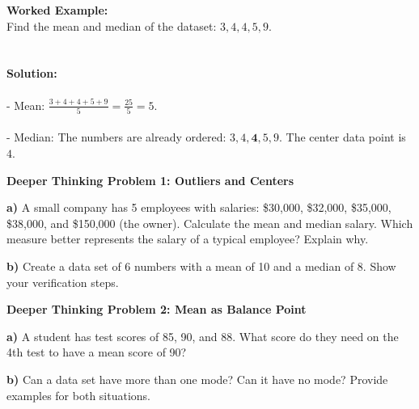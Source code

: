 \documentclass[12pt, letterpaper, fleqn]{article}
\begin{document}
\vspace{1cm}

\vspace{1mm}

\begin{tcolorbox}[colback=white, colframe=black!25, boxrule=0.6pt, arc=4mm, left=6mm, right=6mm, top=4mm, bottom=4mm]
\textbf{Worked Example:}\\
Find the mean and median of the dataset: $3, 4, 4, 5, 9$.\\ \\ \\
\textbf{Solution:}\\ \\
- Mean: $\frac{3 + 4 + 4 + 5 + 9}{5} = \frac{25}{5} = 5.$\\ \\
- Median: The numbers are already ordered: $3, 4, \mathbf{4}, 5, 9$. The center data point is $4$. \\
\end{tcolorbox}

\vspace{4mm}

\begin{tcolorbox}[colback=white, colframe=black, boxrule=1pt, arc=4mm, left=6mm, right=6mm, top=5mm, bottom=5mm]
\textbf{Deeper Thinking Problem 1: Outliers and Centers}

\medskip

\noindent
\textbf{a)} A small company has 5 employees with salaries: \$30,000, \$32,000, \$35,000, \$38,000, and \$150,000 (the owner). Calculate the mean and median salary. Which measure better represents the salary of a typical employee? Explain why.

\vspace{3cm}

\noindent
\textbf{b)} Create a data set of 6 numbers with a mean of 10 and a median of 8. Show your verification steps.

\vspace{3cm}
\end{tcolorbox}

\begin{tcolorbox}[colback=white, colframe=black, boxrule=1pt, arc=4mm, left=6mm, right=6mm, top=5mm, bottom=5mm]
\textbf{Deeper Thinking Problem 2: Mean as Balance Point}

\medskip

\noindent
\textbf{a)} A student has test scores of 85, 90, and 88. What score do they need on the 4th test to have a mean score of 90?

\vspace{3cm}

\noindent
\textbf{b)} Can a data set have more than one mode? Can it have no mode? Provide examples for both situations.

\vspace{4cm}
\end{tcolorbox}
\newpage
\end{document}
